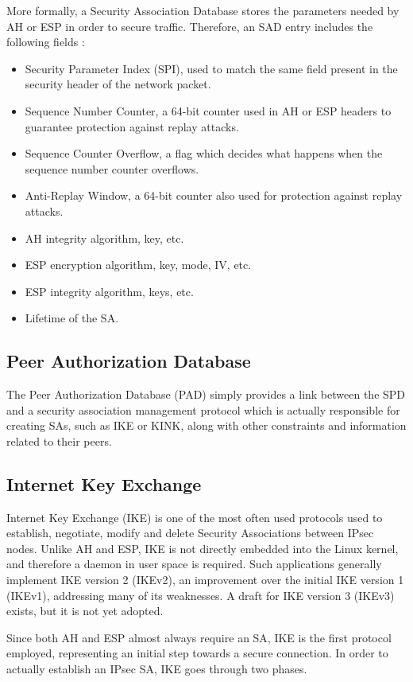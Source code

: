 \documentclass[a4paper,12pt]{report}
\begin{document}
		More formally, a Security Association Database stores the parameters needed by AH or ESP in order to secure traffic. Therefore, an SAD entry includes the following fields \cite{rfc4301}:
	\begin{itemize}
		\item Security Parameter Index (SPI), used to match the same field present in the security header of the network packet.
		\item Sequence Number Counter, a 64-bit counter used in AH or ESP headers to guarantee protection against replay attacks.
		\item Sequence Counter Overflow, a flag which decides what happens when the sequence number counter overflows.
		\item Anti-Replay Window, a 64-bit counter also used for protection against replay attacks.
		\item AH integrity algorithm, key, etc.
		\item ESP encryption algorithm, key, mode, IV, etc.
		\item ESP integrity algorithm, keys, etc.
		\item Lifetime of the SA.
	\end{itemize}
	
	\subsection{Peer Authorization Database}
	The Peer Authorization Database (PAD) simply provides a link between the SPD and a security association management protocol which is actually responsible for creating SAs, such as IKE or KINK, along with other constraints and information related to their peers.
	
	
	\subsection{Internet Key Exchange}
		Internet Key Exchange (IKE) is one of the most often used protocols used to establish, negotiate, modify and delete Security Associations between IPsec nodes. Unlike AH and ESP, IKE is not directly embedded into the Linux kernel, and therefore a daemon in user space is required. Such applications generally implement IKE version 2 (IKEv2), an improvement over the initial IKE version 1 (IKEv1), addressing many of its weaknesses. A draft for IKE version 3 (IKEv3) exists, but it is not yet adopted.
		
		Since both AH and ESP almost always require an SA, IKE is the first protocol employed, representing an initial step towards a secure connection. In order to actually establish an IPsec SA, IKE goes through two phases. 
		
\end{document}
